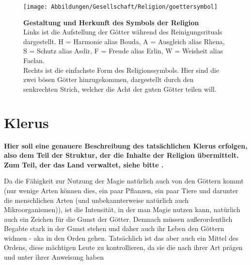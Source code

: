 \begin{figure}[tbh]
	\centering
	\texttt{[image: Abbildungen/Gesellschaft/Religion/goettersymbol]}
	\caption[Das Symbol der Götter]{\textbf{Gestaltung und Herkunft des Symbols der Religion}\\
	Links ist die Aufstellung der Götter während des Reinigungsrituals dargestellt. H = Harmonie alias Bouda, A = Ausgleich alias Rhena, S = Schutz alias Asdir, F = Freude alias Erlin, W = Weisheit alias Faelan.\\
	Rechts ist die einfachste Form des Religionssymbols. Hier sind die zwei bösen Götter hinzugekommen, dargestellt durch den senkrechten Strich, welcher die Acht der guten Götter teilen will.}
	\label{fig:goettersymbol}
\end{figure}












\clearpage
\newpage
\section{Klerus}\label{ch:klerus}
\textbf{Hier soll eine genauere Beschreibung des tatsächlichen Klerus erfolgen, also dem Teil der Struktur, der die Inhalte der Religion übermittelt. 
Zum Teil, der das Land verwaltet, siehe bitte .} 

Da die Fähigkeit zur Nutzung der Magie natürlich auch von den Göttern kommt (nur wenige Arten können dies, ein paar Pflanzen, ein paar Tiere und darunter die menschlichen Arten (und unbekannterweise natürlich auch Mikroorganismen)), ist die Intensität, in der man Magie nutzen kann, natürlich auch ein Zeichen für die Gunst der Götter. 
Demnach müssen außerordentlich Begabte stark in der Gunst stehen und daher auch ihr Leben den Göttern widmen - aka in den Orden gehen. 
Tatsächlich ist das aber auch ein Mittel des Ordens, diese mächtigen Leute zu kontrollieren, da sie die nach ihrer Art prägen und unter ihrer Anweisung haben

